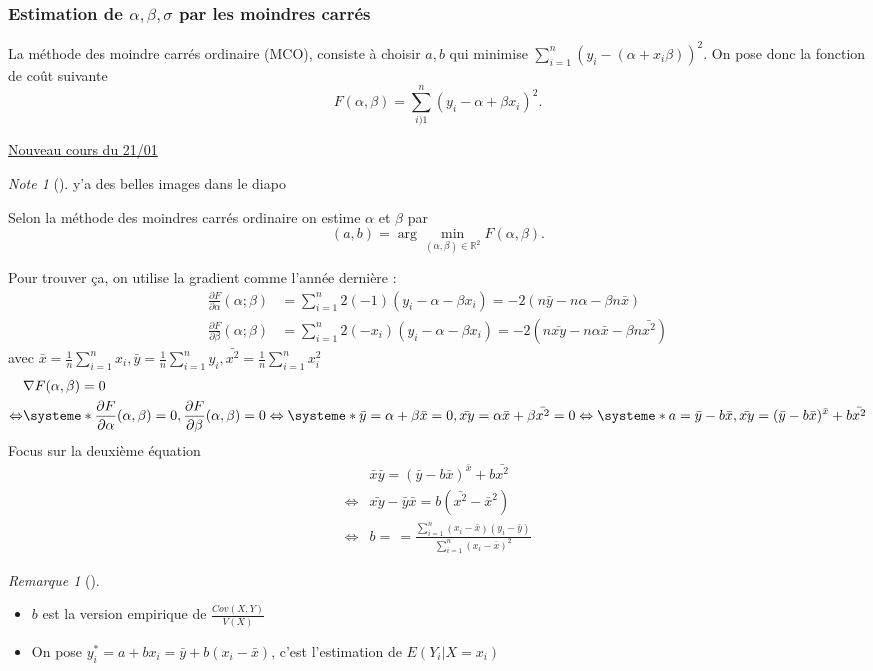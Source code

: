 \documentclass{article}
\theoremstyle{plain}%
\theoremstyle{definition}
\theoremstyle{remark}
\newtheorem*{rem}{Remarque}
\newtheorem*{note}{Note}
\begin{document}
\subsubsection{Estimation de $ \alpha, \beta, \sigma  $ par les moindres carrés}
La méthode des moindre carrés ordinaire (MCO), consiste à choisir $ a,b $ qui minimise $ \sum_{i=1}^{n}(y_i - (\alpha +x_i \beta ))^2 $. On pose donc la fonction de coût suivante 
\[
    F(\alpha, \beta ) = \sum_{i)1}^{n}(y_i - \alpha + \beta x_i)^2
.\] 
    
\underline{Nouveau cours du 21/01} \\

\begin{note}[]
    y'a des belles images dans le diapo
\end{note}

Selon la méthode des moindres carrés ordinaire on estime $ \alpha  $ et $ \beta  $ par 
\[
    (a,b) = \arg \min _{(\alpha, \beta ) \in \mathbb{R}^2} F(\alpha ,\beta )
.\]

Pour trouver ça, on utilise la gradient comme l'année dernière :
\begin{align*}
    \frac{\partial F}{\partial \alpha } (\alpha; \beta ) &= \sum_{i=1}^{n} 2(-1)(y_i - \alpha -\beta x_i) = -2 (n \bar{y} - n \alpha - \beta n \bar{x})\\
    \frac{\partial F}{\partial \beta } (\alpha ; \beta ) &= \sum_{i=1}^{n} 2(-x_i)(y_i - \alpha -\beta x_i) = -2 (n \bar{xy} - n \alpha \bar{x}- \beta n \bar{x^2})
\end{align*}
avec $ \bar{x} = \frac{1}{n}\sum_{i=1}^{n}x_i, \bar{y} = \frac{1}{n}\sum_{i=1}^{n}y_i, \bar{x^2} = \frac{1}{n}\sum_{i=1}^{n}x_i^2 $
\begin{align*}
                    &\nabla F(\alpha ,\beta ) = 0 \\
    \Leftrightarrow & \systeme*{
        \frac{\partial F}{\partial \alpha } (\alpha , \beta ) = 0,
        \frac{\partial F}{\partial \beta } (\alpha , \beta ) = 0
    } \Leftrightarrow \systeme*{
        \bar{y} = \alpha + \beta \bar{x} = 0,
        \bar{xy} = \alpha \bar{x} + \beta \bar{x^2} = 0
    } \Leftrightarrow \systeme*{
        a = \bar{y} - b \bar{x},
        \bar{xy} = (\bar{y} - b \bar{x})^{\bar{x}} + b \bar{x^2}
    }
\end{align*}
Focus sur la deuxième équation
\begin{align*}
                &\bar{x}\bar{y} = (\bar{y} - b \bar{x})^{\bar{x}} + b \bar{x^2} \\
    \Leftrightarrow & \bar{xy} - \bar{y}\bar{x} = b (\bar{x^2} - \bar{x}^2) \\
    \Leftrightarrow &b = \frac{}{} = \frac{\sum_{i=1}^{n} (x_i - \bar{x})(y_i - \bar{y}) }{\sum_{i=1}^{n} (x_i - \bar{x})^2}
\end{align*}
\begin{rem}[]
    \begin{itemize}
        \item $ b $ est la version empirique de $\frac{Cov(X,Y)}{V(X)}$
        \item On pose $ y_i^* = a + b x_i = \bar{y} + b(x_i - \bar{x}) $, c'est l'estimation de $ E(Y_i | X = x_i) $ 
    \end{itemize}
\end{rem}
\end{document}

